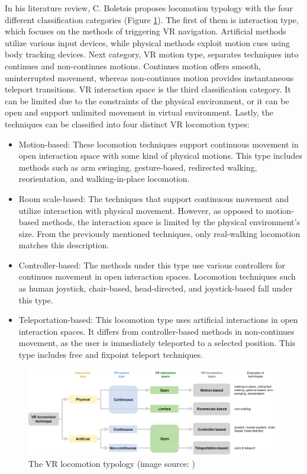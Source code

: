 In his literature review, C. Boletsis proposes locomotion typology with the four different classification categories (Figure \ref{fig:TYPOLOGY}). The first of them is interaction type, which focuses on the methods of triggering VR navigation. Artificial methods utilize various input devices, while physical methods exploit motion cues using body tracking devices. Next category, VR motion type, separates techniques into continues and non-continues motions. Continues motion offers smooth, uninterrupted movement, whereas non-continues motion provides instantaneous teleport transitions. VR interaction space is the third classification category. It can be limited due to the constraints of the physical environment, or it can be open and support unlimited movement in virtual environment. Lastly, the techniques can be classified into four distinct VR locomotion types:

\begin{itemize}
\item Motion-based: These locomotion techniques support continuous movement in open interaction space with some kind of physical motions. This type includes methods such as arm swinging, gesture-based, redirected walking, reorientation, and walking-in-place locomotion.
\item Room scale-based: The techniques that support continuous movement and utilize interaction with physical movement. However, as opposed to motion-based methods, the interaction space is limited by the physical environment's size. From the previously mentioned techniques, only real-walking locomotion matches this description.
\item Controller-based: The methods under this type use various controllers for continues movement in open interaction spaces. Locomotion techniques such as human joystick, chair-based, head-directed, and joystick-based fall under this type.
\item Teleportation-based: This locomotion type uses artificial interactions in open interaction spaces. It differs from controller-based methods in non-continues movement, as the user is immediately teleported to a selected position. This type includes free and fixpoint teleport techniques.
\end{itemize}

\begin{figure}[th]
\centering
\includegraphics[width=1\textwidth]{img/locomotion_typology.png}
\caption{The VR locomotion typology (image source: \cite{LOCOMOTIONREVIEW})}
\label{fig:TYPOLOGY}
\end{figure}

